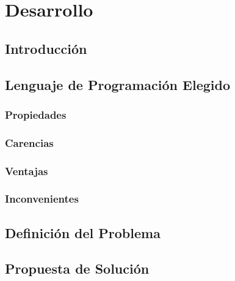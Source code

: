 \chapter{Desarrollo}
\blindtext %

\section{Introducción}
\blindtext %

\section{Lenguaje de Programación Elegido}
\blindtext %

\subsection{Propiedades}
\blindtext %

\subsection{Carencias}
\blindtext %

\subsection{Ventajas}
\blindtext %

\subsection{Inconvenientes}
\blindtext %

\section{Definición del Problema}
\blindtext %

\section{Propuesta de Solución}
\blindtext %